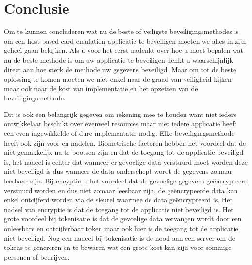 
\chapter{Conclusie}
\label{ch:conclusie}


Om te kunnen concluderen wat nu de beste of veiligste beveiligingsmethodes is om een host-based card emulation applicatie te beveiligen moeten we alles in zijn geheel gaan bekijken. Als u voor het eerst nadenkt over hoe u moet bepalen wat nu de beste methode is om uw  applicatie te beveiligen denkt u waarschijnlijk direct aan hoe sterk de methode uw gegevens beveiligd. Maar om tot de beste oplossing te komen moeten we niet enkel naar de graad van veiligheid kijken maar ook naar de kost van implementatie en het opzetten van de beveiligingsmethode. 

Dit is ook een belangrijk gegeven om rekening mee te houden want niet iedere ontwikkelaar beschikt over evenveel resources maar niet iedere applicatie heeft een even ingewikkelde of dure implementatie nodig. Elke beveiligingsmethode heeft ook zijn voor en nadelen. Biometrische factoren hebben het voordeel dat de niet gemakkelijk na te bootsen zijn en dat de toegang tot de applicatie beveiligd is, het nadeel  is echter dat wanneer er gevoelige data verstuurd moet worden deze niet beveiligd is dus wanneer de data onderschept wordt de gegevens zomaar leesbaar zijn. Bij encyptie is het voordeel dat de gevoelige gegevens geëncrypteerd verstuurd worden en dus niet zomaar leesbaar zijn, de geëncrypeerde data kan enkel ontcijferd worden via de sleutel waarmee de data geëncrypteerd is. Het nadeel van encryptie is dat de toegang tot de applicatie niet beveiligd is. Het grote voordeel bij tokenisatie is dat de gevoelige data vervangen wordt door een onleesbare en ontcijferbaar token maar ook hier is de toegang tot de applicatie niet beveiligd. Nog een nadeel bij tokenisatie is de nood aan een server om de tokens te genereren en te bewaren wat een grote kost kan zijn voor sommige personen of bedrijven. 

